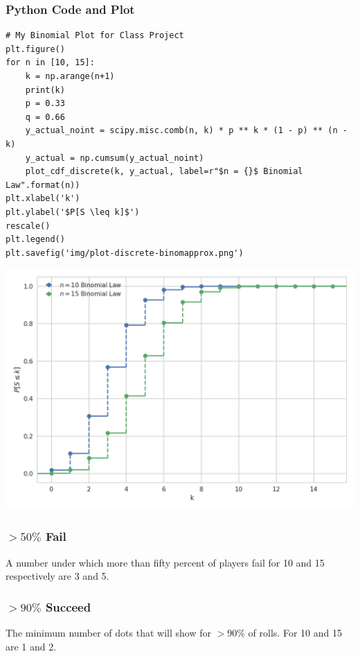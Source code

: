 \documentclass[12pt]{article}
\begin{document}
\subsubsection{Python Code and Plot}
\lstset{language=Python}
\lstset{frame=lines}
\lstset{basicstyle=\footnotesize}
\begin{lstlisting}
# My Binomial Plot for Class Project
plt.figure()
for n in [10, 15]:
    k = np.arange(n+1)
    print(k)
    p = 0.33
    q = 0.66
    y_actual_noint = scipy.misc.comb(n, k) * p ** k * (1 - p) ** (n - k)
    y_actual = np.cumsum(y_actual_noint)
    plot_cdf_discrete(k, y_actual, label=r"$n = {}$ Binomial Law".format(n))
plt.xlabel('k')
plt.ylabel('$P[S \leq k]$')
rescale()
plt.legend()
plt.savefig('img/plot-discrete-binomapprox.png')

\end{lstlisting}
\includegraphics[scale=.5]{plot-discrete-binomapprox.png}


\subsubsection{$>50\%$ Fail}
A number under which more than fifty percent of players fail for 10 and 15 respectively are 3 and 5.

\subsubsection{$>90\%$ Succeed}
The minimum number of dots that will show for $>90\%$ of rolls. For 10 and 15 are 1 and 2.
\end{document}
